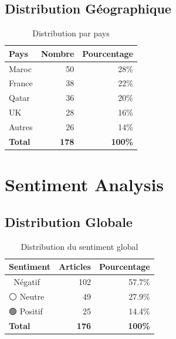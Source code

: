 \documentclass[12pt,a4paper]{report}
\begin{document}
\subsection{Distribution Géographique}

\begin{table}[H]
    \centering
    \begin{tabular}{lrr}
        \toprule
        \textbf{Pays}  & \textbf{Nombre} & \textbf{Pourcentage} \\
        \midrule
        Maroc          & 50              & 28\%                 \\
        France         & 38              & 22\%                 \\
        Qatar          & 36              & 20\%                 \\
        UK             & 28              & 16\%                 \\
        Autres         & 26              & 14\%                 \\
        \midrule
        \textbf{Total} & \textbf{178}    & \textbf{100\%}       \\
        \bottomrule
    \end{tabular}
    \caption{Distribution par pays}
\end{table}

\section{Sentiment Analysis}

\subsection{Distribution Globale}

\begin{table}[H]
    \centering
    \begin{tabular}{lrr}
        \toprule
        \textbf{Sentiment} & \textbf{Articles} & \textbf{Pourcentage} \\
        \midrule
        🔴 Négatif          & 102               & 57.7\%               \\
        ⚪ Neutre           & 49                & 27.9\%               \\
        🟢 Positif          & 25                & 14.4\%               \\
        \midrule
        \textbf{Total}     & \textbf{176}      & \textbf{100\%}       \\
        \bottomrule
    \end{tabular}
    \caption{Distribution du sentiment global}
\end{table}
\end{document}
